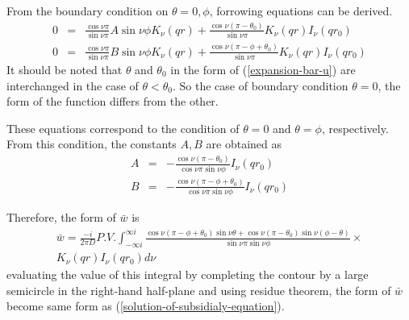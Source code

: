 \documentclass{article}
\begin{document}
From the boundary condition on $\theta = 0, \phi$, forrowing equations can be derived.
\begin{eqnarray}
    0 &=& \frac{\cos\nu\pi}{\sin\nu\pi}
          A\sin\nu\phi
          K_\nu(qr) + \frac{\cos\nu (\pi - \theta_0)}{\sin\nu\pi}
          K_\nu(qr)I_\nu(qr_0) \nonumber \\
    0 &=& \frac{\cos\nu\pi}{\sin\nu\pi}
          B\sin\nu\phi
          K_\nu(qr) + \frac{\cos\nu (\pi - \phi + \theta_0)}{\sin\nu\pi}
          K_\nu(qr)I_\nu(qr_0) \nonumber
\end{eqnarray}
It should be noted that $\theta$ and $\theta_0$ in the form of (\ref{expansion-bar-u})
 are interchanged  in the case of $\theta < \theta_0$.
 So the case of boundary condition $\theta = 0$, the form of the function differs from the other.

These equations correspond to the condition of $\theta=0$ and $\theta=\phi$, respectively.
 From this condition, the constants $A, B$ are obtained as
\begin{eqnarray}
    A &=& -\frac{\cos\nu(\pi-\theta_0)}{\cos\nu\pi\sin\nu\phi}I_\nu(qr_0) \\
    B &=& -\frac{\cos\nu(\pi-\phi+\theta_0)}{\cos\nu\pi\sin\nu\phi}I_\nu(qr_0)
\end{eqnarray}

Therefore, the form of $\bar{w}$ is
\begin{eqnarray} 
    \bar{w} = \frac{-i}{2\pi D}P.V.\int^{\infty i}_{-\infty i}
              \frac{\cos\nu (\pi - \phi + \theta_0)\sin\nu\theta + 
                    \cos\nu(\pi - \theta_0)\sin\nu(\phi - \theta)}
                   {\sin\nu\pi\sin\nu\phi} \times \nonumber \\
              K_\nu(qr)I_\nu(qr_0)d\nu\label{bar-w}
\end{eqnarray}
evaluating the value of this integral by completing the contour by a large semicircle in
 the right-hand half-plane and using residue theorem, the form of $\bar{w}$ become same
 form as (\ref{solution-of-subsidialy-equation}).

\end{document}
